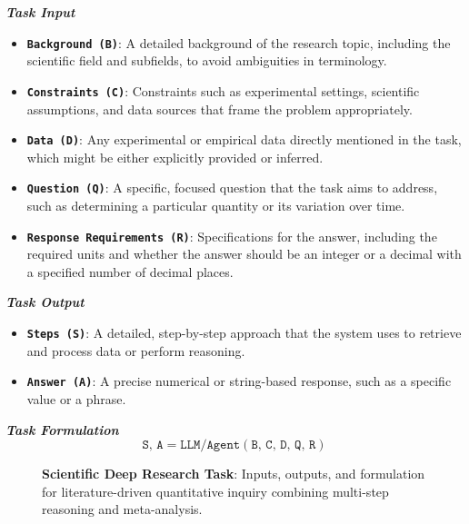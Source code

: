 \begin{tcolorbox}[
    breakable,
    title=Task Definition of Scientific Deep Research,
    colback=LighterGray,
    colframe=DeepPurple,
    colbacktitle=DeepPurple,
    coltitle=White
]
\textbf{\emph{\textcolor{DeepPurple}{Task Input}}}
\begin{itemize}
    \item \texttt{\textbf{Background (B)}}: A detailed background of the research topic, including the scientific field and subfields, to avoid ambiguities in terminology.
    \item \texttt{\textbf{Constraints (C)}}: Constraints such as experimental settings, scientific assumptions, and data sources that frame the problem appropriately.
    \item \texttt{\textbf{Data (D)}}: Any experimental or empirical data directly mentioned in the task, which might be either explicitly provided or inferred.
    \item \texttt{\textbf{Question (Q)}}: A specific, focused question that the task aims to address, such as determining a particular quantity or its variation over time.
    \item \texttt{\textbf{Response Requirements (R)}}: Specifications for the answer, including the required units and whether the answer should be an integer or a decimal with a specified number of decimal places.
\end{itemize}

\textbf{\emph{\textcolor{DeepPurple}{Task Output}}}
\begin{itemize}
    \item \texttt{\textbf{Steps (S)}}: A detailed, step-by-step approach that the system uses to retrieve and process data or perform reasoning.
    \item \texttt{\textbf{Answer (A)}}: A precise numerical or string-based response, such as a specific value or a phrase.
\end{itemize}

\textbf{\emph{\textcolor{DeepPurple}{Task Formulation}}}
\[
\texttt{S, A} = \texttt{LLM/Agent}(\texttt{B, C, D, Q, R})
\]
\end{tcolorbox}

\begin{figure}[ht]
    \vspace{0.01cm}
    \caption{\textbf{Scientific Deep Research Task}: Inputs, outputs, and formulation for literature-driven quantitative inquiry combining multi-step reasoning and meta-analysis.}
    \label{fig:Task Definition of Scientific Deep Research}
\end{figure}


